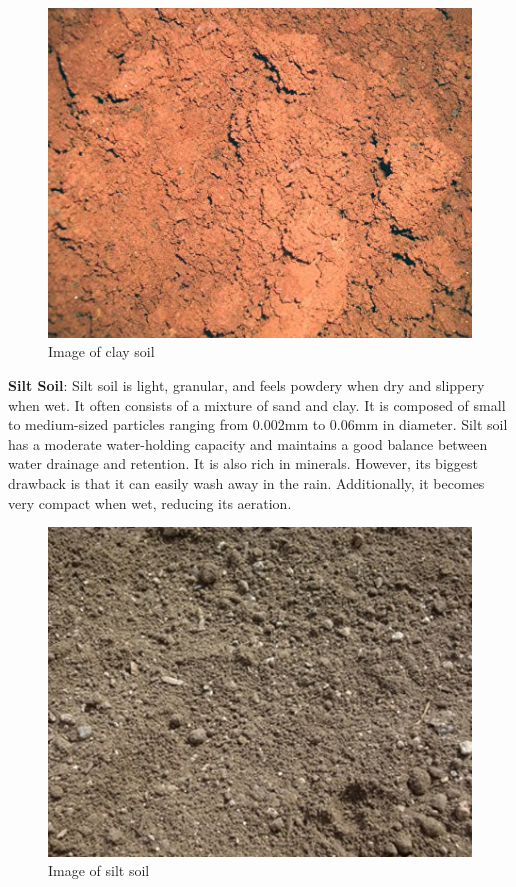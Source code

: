 \documentclass{article}
\begin{document}
\begin{flushleft}
\begin{center}
\begin{figure}[h]
    \centering
\includegraphics[scale=0.5]{Soil/Clay-Soil.jpg}
\caption{Image of clay soil}
\end{figure}
\end{center}

\vspace*{5pt}
 \textbf{Silt Soil}: Silt soil is light, granular, and feels powdery when dry and slippery when wet. It often consists of a mixture of sand and clay.
  It is composed of small to medium-sized particles ranging from 0.002mm to 0.06mm in diameter. Silt soil has a moderate water-holding capacity and maintains a good balance between water drainage and retention. It is also rich in minerals. However, its biggest drawback is that it can easily wash away in the rain. Additionally, it becomes very compact when wet, reducing its aeration.
\newline
\vspace*{3pt}

\begin{center}
\begin{figure}[h]
    \centering
\includegraphics[scale=0.5]{Soil/Silt-Soil.jpg}
\caption{Image of silt soil}
\end{figure}
\end{center}


\end{flushleft}
\end{document}
